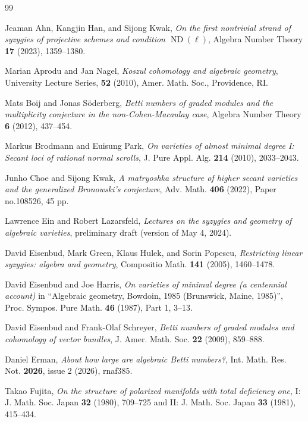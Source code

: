 \documentclass[12pt]{amsart}
\theoremstyle{definition}
\theoremstyle{remark}
\theoremstyle{corollary}
\theoremstyle{theorem}
\theoremstyle{corollary}
\theoremstyle{corollary}
\theoremstyle{definition}
\theoremstyle{remark}
\numberwithin{equation}{section}
\DeclareMathOperator{\ND}{ND}
\begin{document}
\begin{thebibliography}{99}

Jeaman Ahn, Kangjin Han, and Sijong Kwak, \textit{On the first nontrivial strand of syzygies of projective schemes and condition $\ND(\ell)$}, Algebra Number Theory \textbf{17} (2023), 1359--1380.

Marian Aprodu and Jan Nagel, \textit{Koszul cohomology and algebraic geometry},  University Lecture Series, \textbf{52} (2010), Amer. Math. Soc., Providence, RI.

Mats Boij and Jonas S\"{o}derberg, \textit{Betti numbers of graded modules and the multiplicity conjecture in the non-Cohen-Macaulay case}, Algebra Number Theory \textbf{6} (2012), 437--454.

Markus Brodmann and Euisung Park, \textit{On varieties of almost minimal degree I: Secant loci of rational normal scrolls}, J. Pure Appl. Alg. \textbf{214} (2010), 2033--2043.

Junho Choe and Sijong Kwak, \textit{A matryoshka structure of higher secant varieties and the generalized Bronowski's conjecture}, Adv. Math. \textbf{406} (2022), Paper no.108526, 45 pp.

Lawrence Ein and Robert Lazarsfeld, \textit{Lectures on the syzygies and geometry of algebraic
varieties}, preliminary draft (version of May 4, 2024).

David Eisenbud, Mark Green, Klaus Hulek, and Sorin Popescu, \textit{Restricting linear syzygies: algebra and geometry}, Compositio Math. \textbf{141} (2005), 1460--1478.

David Eisenbud and Joe Harris, \textit{On varieties of minimal degree (a centennial account)} in ``Algebraic geometry, Bowdoin, 1985 (Brunswick, Maine, 1985)'', Proc. Sympos.
Pure Math. \textbf{46} (1987), Part 1, 3--13.

David Eisenbud and Frank-Olaf Schreyer, \textit{Betti numbers of graded modules and cohomology of vector bundles}, J. Amer. Math. Soc. \textbf{22} (2009), 859--888.

Daniel Erman, \textit{About how large are algebraic Betti numbers?}, Int. Math. Res. Not. \textbf{2026}, issue 2 (2026), rnaf385.

Takao Fujita, \textit{On the structure of polarized manifolds with total deficiency one}, I: J. Math. Soc. Japan \textbf{32} (1980), 709--725 and II: J. Math. Soc. Japan \textbf{33} (1981), 415--434.
    

\end{thebibliography}
\end{document}
